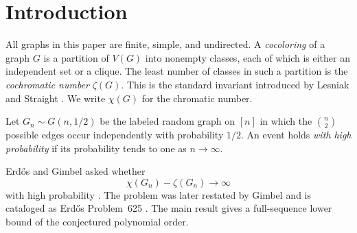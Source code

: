 
\begin{abstract}
Let $G_n\sim G(n,1/2)$.  We prove that the difference between the chromatic
number $\chi(G_n)$ and the cochromatic number $\zeta(G_n)$ is at least a
positive constant times $n/(\log n)^3$ with probability tending to one.  The
argument is uniform across the full rounding phase of the independence-number
threshold.  Its first-moment component compares ordinary colorings with signed
cocoloring witnesses supported on four consecutive class sizes.  For the
second moment, we derive an exact sign-compatibility identity, encode the large
overlap cells by a matching with local deficits, sum the associated physical
matching fibers exactly, and control the residual even-subgraph factor by
injective restriction outside the exposed matching.  A bounded-differences
argument then amplifies the resulting positive-probability seed to a
high-probability cocoloring.
\end{abstract}

\maketitle

\section{Introduction}\label{sec:introduction-v2}

All graphs in this paper are finite, simple, and undirected.  A
\emph{cocoloring} of a graph $G$ is a partition of $V(G)$ into nonempty classes,
each of which is either an independent set or a clique.  The least number of
classes in such a partition is the \emph{cochromatic number} $\zeta(G)$.  This
is the standard invariant introduced by Lesniak and Straight
\citep{lesniak-straight-1977}.  We write $\chi(G)$ for the chromatic number.

Let $G_n\sim G(n,1/2)$ be the labeled random graph on $[n]$ in which the
$\binom n2$ possible edges occur independently with probability $1/2$.  An
event holds \emph{with high probability} if its probability tends to one as
$n\to\infty$.

Erd\H{o}s and Gimbel asked whether
\[
  \chi(G_n)-\zeta(G_n)\longrightarrow\infty
\]
with high probability \citep[p.~263]{erdos-gimbel-1993}.  The problem was
later restated by Gimbel \citep[Section~7.4]{gimbel-2016} and is cataloged as
Erd\H{o}s Problem~625 \citep{bloom-erdos625}.  The main result gives a
full-sequence lower bound of the conjectured polynomial order.

